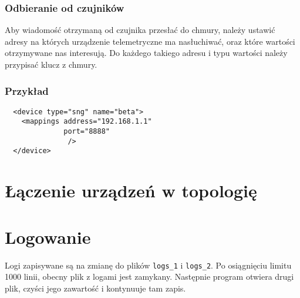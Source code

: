 \documentclass[11pt]{article}
\begin{document}
\subsubsection{Odbieranie od czujników}
Aby wiadomość otrzymaną od czujnika przesłać do chmury, należy ustawić adresy na których urządzenie telemetryczne
ma nasłuchiwać, oraz które wartości otrzymywane nas interesują. Do każdego takiego adresu i typu wartości
należy przypisać klucz z chmury.

\subsubsection{Przykład}
\begin{verbatim}
  <device type="sng" name="beta">
    <mappings address="192.168.1.1"
              port="8888"
               />
  </device>
\end{verbatim}


\section{Łączenie urządzeń w topologię}

\section{Logowanie}

Logi zapisywane są na zmianę do plików \verb|logs_1| i \verb|logs_2|. Po osiągnięciu limitu 1000 linii, obecny plik z logami jest zamykany. Następnie program otwiera drugi plik, czyści jego zawartość i kontynuuje tam zapis. 

\end{document}
